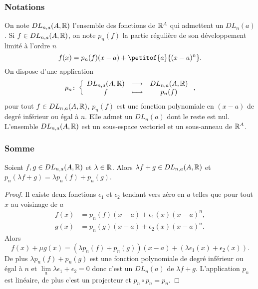 \subsubsection{Notations}

On note $DL_{n,a}(A,\mathbb{R})$ l'ensemble des fonctions de $\mathbb{R}^A$ qui admettent un $DL_n(a)$. Si $f \in DL_{n,a}(A,\mathbb{R})$, on note $p_n(f)$ la partie régulière de son développement limité à l'ordre $n$
\begin{equation}
  f(x)=p_n(f)(x-a)+\petitof{a}{(x-a)^n}.
\end{equation}
On dispose d'une application
\begin{equation}
  p_n\colon \left\{\begin{array}{ccc} DL_{n,a}(A,\mathbb{R}) & \longrightarrow &DL_{n,a}(A,\mathbb{R})\\ f & \longmapsto & p_n(f) \end{array} \right.,
\end{equation}
pour tout $f \in DL_{n,a}(A,\mathbb{R})$, $p_n(f)$ est une fonction polynomiale en $(x-a)$ de degré inférieur ou égal à $n$. Elle admet un $DL_n(a)$ dont le reste est nul. L'ensemble $DL_{n,a}(A,\mathbb{R})$ est un sous-espace vectoriel et un sous-anneau de $\mathbb{R}^A$.

\subsubsection{Somme}

\begin{prop}[Linéarité]
  Soient $f,g \in DL_{n,a}(A,\mathbb{R})$ et $\lambda \in \mathbb{R}$. Alors $\lambda f + g \in DL_{n,a}(A,\mathbb{R})$ et $p_n(\lambda f +g)= \lambda p_n(f) +p_n(g)$.   
\end{prop}
\begin{proof}
  Il existe deux fonctions $\epsilon_1$ et $\epsilon_2$ tendant vers zéro en $a$ telles que pour tout $x$ au voisinage de $a$
  \begin{align}
    f(x) &= p_n(f)(x-a)+\epsilon_1(x)(x-a)^n, \\
    g(x) &= p_n(g)(x-a)+\epsilon_2(x)(x-a)^n. 
  \end{align}
  Alors
  \begin{equation}
    f(x)+\mu g(x) = (\lambda p_n(f)+p_n(g))(x-a)+(\lambda \epsilon_1(x) + \epsilon_2(x)).
  \end{equation}
  De plus $\lambda p_n(f)+p_n(g)$ est une fonction polynomiale de degré inférieur ou égal à $n$ et $\lim\limits_{a} \lambda \epsilon_1 + \epsilon_2 =0$ donc c'est un $DL_n(a)$ de $\lambda f +g$. L'application $p_n$ est linéaire, de plus c'est un projecteur et  $p_n \circ p_n =p_n$.
\end{proof}

